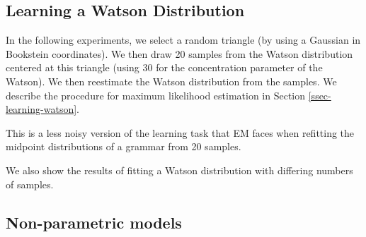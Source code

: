 


\subsection{Learning a Watson Distribution} 


In the following experiments, we select a random triangle (by using a
Gaussian in Bookstein coordinates). We then draw 20 samples from the
Watson distribution centered at this triangle (using 30 for the
concentration parameter of the Watson). We then reestimate the Watson
distribution from the samples. We describe the procedure for maximum
likelihood estimation in Section \ref{ssec-learning-watson}.

This is a less noisy version of the learning task that EM faces when
refitting the midpoint distributions of a grammar from 20 samples.



We also show the results of fitting a Watson distribution with
differing numbers of samples.



\FloatBarrier

\subsection{Non-parametric models}

